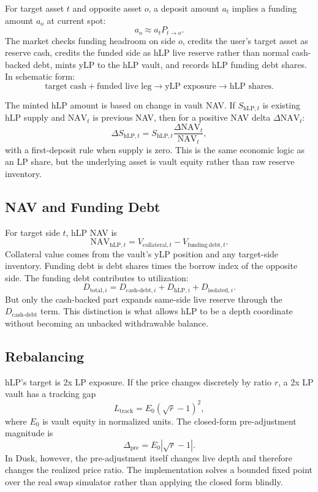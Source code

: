 \documentclass[11pt]{article}
\newcommand{\cash}{\mathrm{cash}}
\newcommand{\hlp}{\mathrm{hLP}}
\newcommand{\debt}{\mathrm{debt}}
\newcommand{\nav}{\mathrm{NAV}}
\begin{document}
For target asset $t$ and opposite asset $o$, a deposit amount $a_t$ implies a funding amount $a_o$ at current spot:
\begin{equation}
a_o \approx a_t P_{t\to o}.
\end{equation}
The market checks funding headroom on side $o$, credits the user's target asset as reserve cash, credits the funded side as hLP live reserve rather than normal cash-backed debt, mints yLP to the hLP vault, and records hLP funding debt shares. In schematic form:
\[
\text{target cash}+\text{funded live leg}
\rightarrow
\text{yLP exposure}
\rightarrow
\text{hLP shares}.
\]

The minted hLP amount is based on change in vault NAV. If $S_{\hlp,t}$ is existing hLP supply and $\nav_t$ is previous NAV, then for a positive NAV delta $\Delta\nav_t$:
\begin{equation}
\Delta S_{\hlp,t}
=
S_{\hlp,t}\frac{\Delta\nav_t}{\nav_t},
\end{equation}
with a first-deposit rule when supply is zero. This is the same economic logic as an LP share, but the underlying asset is vault equity rather than raw reserve inventory.

\subsection{NAV and Funding Debt}

For target side $t$, hLP NAV is
\begin{equation}
\nav_{\hlp,t}=V_{\mathrm{collateral},t}-V_{\mathrm{funding\ debt},t}.
\end{equation}
Collateral value comes from the vault's yLP position and any target-side inventory. Funding debt is debt shares times the borrow index of the opposite side. The funding debt contributes to utilization:
\begin{equation}
D_{\mathrm{total},i}=D_{\cash\text{-}\debt,i}+D_{\hlp,i}+D_{\mathrm{isolated},i}.
\end{equation}
But only the cash-backed part expands same-side live reserve through the $D_{\cash\text{-}\debt}$ term. This distinction is what allows hLP to be a depth coordinate without becoming an unbacked withdrawable balance.

\subsection{Rebalancing}

hLP's target is 2x LP exposure. If the price changes discretely by ratio $r$, a 2x LP vault has a tracking gap
\begin{equation}
L_{\mathrm{track}}=E_0(\sqrt r-1)^2,
\label{eq:tracking}
\end{equation}
where $E_0$ is vault equity in normalized units. The closed-form pre-adjustment magnitude is
\begin{equation}
\Delta_{\mathrm{pre}}=E_0|\sqrt r-1|.
\end{equation}
In Dusk, however, the pre-adjustment itself changes live depth and therefore changes the realized price ratio. The implementation solves a bounded fixed point over the real swap simulator rather than applying the closed form blindly.
\end{document}
